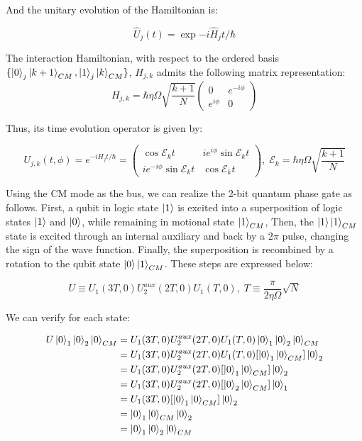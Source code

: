 \documentclass[../main.tex]{subfiles}
\begin{document}
\noindent And the unitary evolution of the Hamiltonian is:

\begin{equation}
    \hat{U}_j(t) = \exp{-i\hat{H}_j t/\hbar}
\end{equation}

The interaction Hamiltonian, with respect to the ordered basis $\{\ket{0}_j\ket{k+1}_{CM}, \ket{1}_j\ket{k}_{CM}\}$, $H_{j,k}$ admits the following matrix representation:
\begin{equation}
    H_{j,k} = \hbar\eta\Omega\sqrt{\frac{k+1}{N}}\begin{pmatrix}
        0 & e^{-i\phi}\\
        e^{i\phi} & 0
    \end{pmatrix}
\end{equation}

\noindent Thus, its time evolution operator is given by:

\begin{equation}
    U_{j,k}(t,\phi) = e^{-iH_j t/\hbar} = \begin{pmatrix}
         \cos{\mathcal{E}_k t} &ie^{i\phi}\sin{\mathcal{E}_k t}\\
        ie^{-i\phi}\sin{\mathcal{E}_k t} &\cos{\mathcal{E}_k t}
    \end{pmatrix}, \; \mathcal{E}_k = \hbar\eta\Omega\sqrt{\frac{k+1}{N}}
\end{equation}

\noindent Using the CM mode as the bus, we can realize the 2-bit quantum phase gate as follows. First, a qubit in logic state $\ket{1}$ is excited into a superposition of logic states $\ket{1}$ and $\ket{0}$, while remaining in motional state $\ket{1}_{CM}$, Then, the $\ket{1}\ket{1}_{CM}$ state is excited through an internal auxiliary and back by a 2$\pi$ pulse, changing the sign of the wave function. Finally, the superposition is recombined by a rotation to the qubit state $\ket{0}\ket{1}_{CM}$. These steps are expressed below:

\begin{equation}
    U \equiv U_1(3T,0)U_2^{aux}(2T,0)U_1(T,0),\; T \equiv \frac{\pi}{2\eta\Omega}\sqrt{N}
    \label{eq: CROT}
\end{equation}

We can verify for each state: 

\begin{equation}
    \begin{split}
        U\ket{0}_1\ket{0}_2\ket{0}_{CM} &=  U_1(3T,0)U_2^{aux}(2T,0)U_1(T,0)\ket{0}_1\ket{0}_2\ket{0}_{CM}\\
        &= U_1(3T,0)U_2^{aux}(2T,0)U_1(T,0)[\ket{0}_1\ket{0}_{CM}]\ket{0}_2\\
        &= U_1(3T,0)U_2^{aux}(2T,0)[\ket{0}_1\ket{0}_{CM}]\ket{0}_2\\
        &= U_1(3T,0)U_2^{aux}(2T,0)[\ket{0}_2\ket{0}_{CM}]\ket{0}_1\\
        &= U_1(3T,0)[\ket{0}_1\ket{0}_{CM}]\ket{0}_2\\
        &= \ket{0}_1\ket{0}_{CM}\ket{0}_2\\
        &= \ket{0}_1\ket{0}_2\ket{0}_{CM}
    \end{split}
\end{equation}
\end{document}
